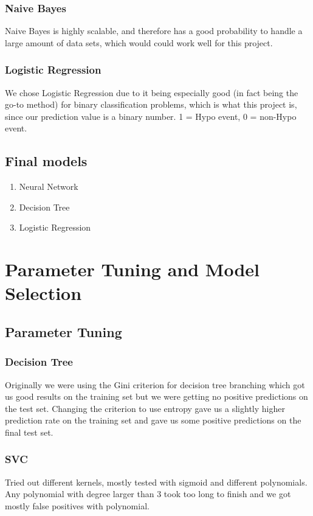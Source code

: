 \documentclass[11pt,a4paper]{article}
\begin{document}
		\subsubsection{Naive Bayes}
			Naive Bayes is highly scalable, and therefore has a good probability to handle a large amount of data sets, which would could work well for this project.

		\subsubsection{Logistic Regression}
			We chose Logistic Regression due to it being especially good (in fact being the go-to method) for binary classification problems, which is what this project is, since our prediction value is a binary number. 1 = Hypo event, 0 = non-Hypo event.

	\subsection{Final models}
		\begin{enumerate}
			\item Neural Network
			\item Decision Tree
			\item Logistic Regression
		\end{enumerate}

\section{Parameter Tuning and Model Selection }
	\subsection{Parameter Tuning}

		\subsubsection{Decision Tree}
			Originally we were using the Gini criterion for decision tree branching which got us good results on the training set but we were getting no positive predictions on the test set.
			Changing the criterion to use entropy gave us a slightly higher prediction rate on the training set and gave us some positive predictions on the final test set.

		\subsubsection{SVC}
			Tried out different kernels, mostly tested with sigmoid and different polynomials.
			Any polynomial with degree larger than 3 took too long to finish and we got mostly false positives with polynomial.
\end{document}

